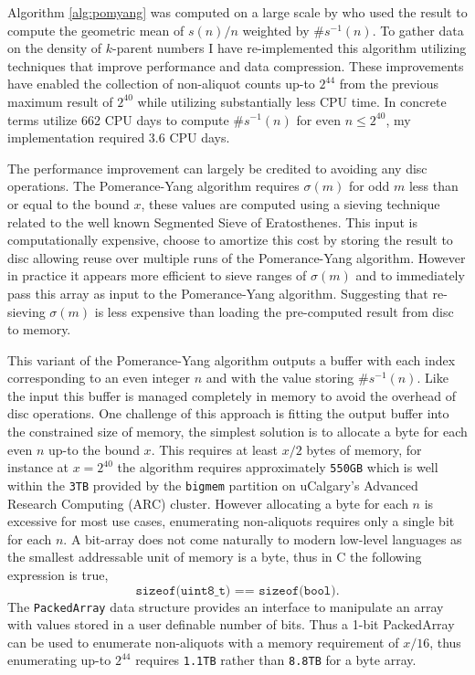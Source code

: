 \documentclass{article}
\theoremstyle{definition}
\begin{document}
Algorithm \ref{alg:pomyang} was computed on a large scale by \cite{chum_guy_jacobson_mosunov_2018} who used the result to compute the geometric mean of $s(n) / n$ weighted by $\#s^{-1}(n)$. To gather data on the density of $k$-parent numbers I have re-implemented this algorithm utilizing techniques that improve performance and data compression. These improvements have enabled the collection of non-aliquot counts up-to $2^{44}$ from the previous maximum result of $2^{40}$ while utilizing substantially less CPU time. In concrete terms \cite{chum_guy_jacobson_mosunov_2018} utilize 662 CPU days to compute $\#s^{-1}(n)$ for even $n \leq 2^{40}$, my implementation required 3.6 CPU days.

The performance improvement can largely be credited to avoiding any disc operations. The Pomerance-Yang algorithm requires $\sigma(m)$ for odd $m$ less than or equal to the bound $x$, these values are computed using a sieving technique related to the well known Segmented Sieve of Eratosthenes. This input is computationally expensive, \cite{chum_guy_jacobson_mosunov_2018} choose to amortize this cost by storing the result to disc allowing reuse over multiple runs of the Pomerance-Yang algorithm. However in practice it appears more efficient to sieve ranges of $\sigma(m)$ and to immediately pass this array as input to the Pomerance-Yang algorithm. Suggesting that re-sieving $\sigma(m)$ is less expensive than loading the pre-computed result from disc to memory.

This variant of the Pomerance-Yang algorithm outputs a buffer with each index corresponding to an even integer $n$ and with the value storing $\#s^{-1}(n)$. Like the input this buffer is managed completely in memory to avoid the overhead of disc operations. One challenge of this approach is fitting the output buffer into the constrained size of memory, the simplest solution is to allocate a byte for each even $n$ up-to the bound $x$. This requires at least $x/2$ bytes of memory, for instance at $x = 2^{40}$ the algorithm requires approximately \texttt{550GB} which is well within the \texttt{3TB} provided by the \texttt{bigmem} partition on uCalgary's Advanced Research Computing (ARC) cluster. However allocating a byte for each $n$ is excessive for most use cases, enumerating non-aliquots requires only a single bit for each $n$. A bit-array does not come naturally to modern low-level languages as the smallest addressable unit of memory is a byte, thus in C the following expression is true,
$$\texttt{sizeof(uint8\_t) == sizeof(bool)}.$$
The \texttt{PackedArray} data structure \cite{packedArray} provides an interface to manipulate an array with values stored in a user definable number of bits. Thus a 1-bit PackedArray can be used to enumerate non-aliquots with a memory requirement of $x/16$, thus enumerating up-to $2^{44}$ requires \texttt{1.1TB} rather than \texttt{8.8TB} for a byte array.
\end{document}
